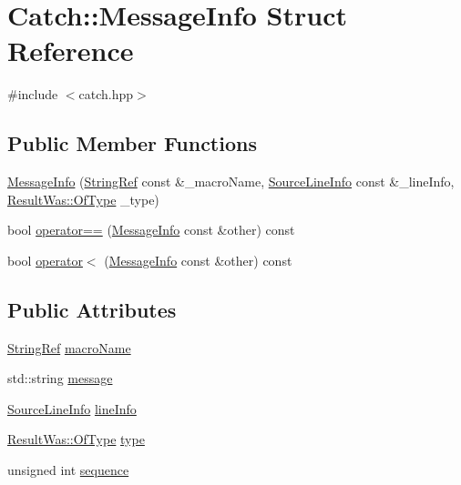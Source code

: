 \hypertarget{struct_catch_1_1_message_info}{}\section{Catch\+:\+:Message\+Info Struct Reference}
\label{struct_catch_1_1_message_info}


{\ttfamily \#include $<$catch.\+hpp$>$}

\subsection*{Public Member Functions}
\begin{DoxyCompactItemize}
\item 
\mbox{\hyperlink{struct_catch_1_1_message_info_afac7a84a9e8655428035a3c5418044f0}{Message\+Info}} (\mbox{\hyperlink{class_catch_1_1_string_ref}{String\+Ref}} const \&\+\_\+macro\+Name, \mbox{\hyperlink{struct_catch_1_1_source_line_info}{Source\+Line\+Info}} const \&\+\_\+line\+Info, \mbox{\hyperlink{struct_catch_1_1_result_was_a624e1ee3661fcf6094ceef1f654601ef}{Result\+Was\+::\+Of\+Type}} \+\_\+type)
\item 
bool \mbox{\hyperlink{struct_catch_1_1_message_info_af4b37f2172ba55395813b4bb6bbbde1a}{operator==}} (\mbox{\hyperlink{struct_catch_1_1_message_info}{Message\+Info}} const \&other) const
\item 
bool \mbox{\hyperlink{struct_catch_1_1_message_info_a8254cb8fca2da02a29a9843cdcb79df1}{operator$<$}} (\mbox{\hyperlink{struct_catch_1_1_message_info}{Message\+Info}} const \&other) const
\end{DoxyCompactItemize}
\subsection*{Public Attributes}
\begin{DoxyCompactItemize}
\item 
\mbox{\hyperlink{class_catch_1_1_string_ref}{String\+Ref}} \mbox{\hyperlink{struct_catch_1_1_message_info_a3ee7cd41def0989d2193bad7101436a0}{macro\+Name}}
\item 
std\+::string \mbox{\hyperlink{struct_catch_1_1_message_info_ab6cd06e050bf426c6577502a5c50e256}{message}}
\item 
\mbox{\hyperlink{struct_catch_1_1_source_line_info}{Source\+Line\+Info}} \mbox{\hyperlink{struct_catch_1_1_message_info_a985165328723e599696ebd8e43195cc5}{line\+Info}}
\item 
\mbox{\hyperlink{struct_catch_1_1_result_was_a624e1ee3661fcf6094ceef1f654601ef}{Result\+Was\+::\+Of\+Type}} \mbox{\hyperlink{struct_catch_1_1_message_info_ae928b9117465c696e45951d9d0284e78}{type}}
\item 
unsigned int \mbox{\hyperlink{struct_catch_1_1_message_info_a7f4f57ea21e50160adefce7b68a781d6}{sequence}}
\end{DoxyCompactItemize}


